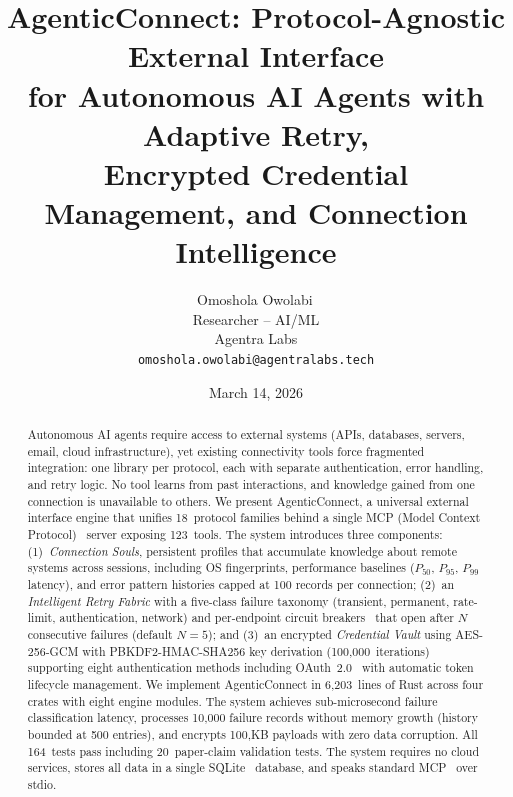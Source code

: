 \documentclass[10pt, twocolumn]{article}
\title{\textbf{AgenticConnect: Protocol-Agnostic External Interface\\for Autonomous AI Agents with Adaptive Retry,\\Encrypted Credential Management, and Connection Intelligence}}
\author{Omoshola Owolabi\,\orcidlink{0009-0006-4089-0732}\\Researcher -- AI/ML\\Agentra Labs\\\texttt{omoshola.owolabi@agentralabs.tech}}
\date{March 14, 2026}
\begin{document}
\maketitle
\thispagestyle{fancy}

\begin{abstract}
Autonomous AI agents require access to external systems (APIs, databases, servers, email, cloud infrastructure), yet existing connectivity tools force fragmented integration: one library per protocol, each with separate authentication, error handling, and retry logic. No tool learns from past interactions, and knowledge gained from one connection is unavailable to others. We present AgenticConnect, a universal external interface engine that unifies 18~protocol families behind a single MCP (Model Context Protocol)~\cite{mcp2024} server exposing 123~tools. The system introduces three components: (1)~\emph{Connection Souls}, persistent profiles that accumulate knowledge about remote systems across sessions, including OS fingerprints, performance baselines ($P_{50}$, $P_{95}$, $P_{99}$ latency), and error pattern histories capped at 100 records per connection; (2)~an \emph{Intelligent Retry Fabric} with a five-class failure taxonomy (transient, permanent, rate-limit, authentication, network) and per-endpoint circuit breakers~\cite{nygard2018release} that open after $N$ consecutive failures (default $N{=}5$); and (3)~an encrypted \emph{Credential Vault} using AES-256-GCM with PBKDF2-HMAC-SHA256 key derivation (100{,}000~iterations) supporting eight authentication methods including OAuth~2.0~\cite{rfc6749} with automatic token lifecycle management. We implement AgenticConnect in 6{,}203~lines of Rust across four crates with eight engine modules. The system achieves sub-microsecond failure classification latency, processes 10{,}000 failure records without memory growth (history bounded at 500 entries), and encrypts 100{,}KB payloads with zero data corruption. All 164~tests pass including 20~paper-claim validation tests. The system requires no cloud services, stores all data in a single SQLite~\cite{sqlite2024} database, and speaks standard MCP~\cite{mcp2024} over stdio.
\end{abstract}

\end{document}
